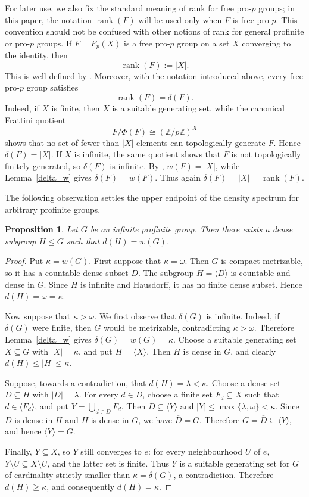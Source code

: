 \documentclass[12pt]{amsart}
\newtheorem{proposition}[theorem]{Proposition}
\theoremstyle{definition}
\numberwithin{equation}{section}
\theoremstyle{remark}
\begin{document}
For later use, we also fix the standard meaning of rank for free pro-$p$ groups; in this paper, the notation $\operatorname{rank}(F)$ will be used only when $F$ is free pro-$p$. This convention should not be confused with other notions of rank for general profinite or pro-$p$ groups. If $F=F_p(X)$ is a free pro-$p$ group on a set $X$ converging to the identity, then
\[
\operatorname{rank}(F):=|X|.
\]
This is well defined by \cite[Lemma~3.3.5]{RZ}. Moreover, with the notation introduced above, every free pro-$p$ group satisfies
\[
\operatorname{rank}(F)=\delta(F).
\]
Indeed, if $X$ is finite, then $X$ is a suitable generating set, while the canonical Frattini quotient
\[
F/\Phi(F)\cong(\mathbb Z/p\mathbb Z)^X
\]
shows that no set of fewer than $|X|$ elements can topologically generate $F$. Hence $\delta(F)=|X|$. If $X$ is infinite, the same quotient shows that $F$ is not topologically finitely generated, so $\delta(F)$ is infinite. By \cite[Proposition~2.6.2(b)]{RZ}, $w(F)=|X|$, while Lemma~\ref{delta=w} gives $\delta(F)=w(F)$. Thus again $\delta(F)=|X|=\operatorname{rank}(F)$.

The following observation settles the upper endpoint of the density spectrum for arbitrary profinite groups.

\begin{proposition}\label{maxdense}
Let $G$ be an infinite profinite group. Then there exists a dense subgroup $H\leq G$ such that $d(H)=w(G)$.
\end{proposition}

\begin{proof}
Put $\kappa=w(G)$. First suppose that $\kappa=\omega$. Then $G$ is compact metrizable, so it has a countable dense subset $D$. The subgroup $H=\langle D\rangle$ is countable and dense in $G$. Since $H$ is infinite and Hausdorff, it has no finite dense subset. Hence $d(H)=\omega=\kappa$.

Now suppose that $\kappa>\omega$. We first observe that $\delta(G)$ is infinite. Indeed, if $\delta(G)$ were finite, then $G$ would be metrizable, contradicting $\kappa>\omega$.
Therefore Lemma~\ref{delta=w} gives $\delta(G)=w(G)=\kappa$. Choose a suitable generating set $X\subseteq G$ with $|X|=\kappa$, and put $H=\langle X\rangle$. Then $H$ is dense in $G$, and clearly
$d(H)\leq |H|\leq\kappa$.

Suppose, towards a contradiction, that $d(H)=\lambda<\kappa$. Choose a dense set $D\subseteq H$ with $|D|=\lambda$. For every $d\in D$, choose a finite set $F_d\subseteq X$ such that $d\in\langle F_d\rangle$, and put $Y=\bigcup_{d\in D}F_d$.
Then $D\subseteq\langle Y\rangle$ and $|Y|\leq\max\{\lambda,\omega\}<\kappa$. Since $D$ is dense in $H$ and $H$ is dense in $G$, we have $\overline{D}=G$. Therefore
$G=\overline{D}\subseteq\overline{\langle Y\rangle}$, and hence
$\overline{\langle Y\rangle}=G$.

Finally, $Y\subseteq X$, so $Y$ still converges to $e$: for every neighbourhood $U$ of $e$,
$Y\setminus U\subseteq X\setminus U$, and the latter set is finite. Thus $Y$ is a suitable generating set for $G$ of cardinality strictly smaller than $\kappa=\delta(G)$, a contradiction. Therefore $d(H)\geq\kappa$, and consequently $d(H)=\kappa$.
\end{proof}
\end{document}
